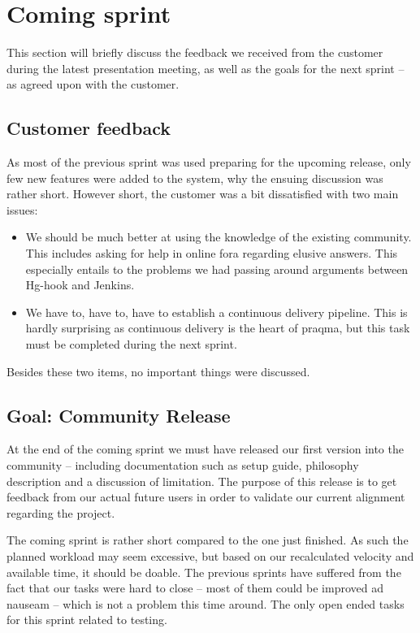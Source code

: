 \documentclass[a4paper,11pt]{article}
\begin{document}
\section{Coming sprint}
This section will briefly discuss the feedback we received from the customer during
the latest presentation meeting, as well as the goals for the next sprint -- as 
agreed upon with the customer.

\subsection{Customer feedback}
As most of the previous sprint was used preparing for the upcoming release, only
few new features were added to the system, why the ensuing discussion was rather short.
However short, the customer was a bit dissatisfied with two main issues:
\begin{itemize}
	\item We should be much better at using the knowledge of the existing community.
		This includes asking for help in online fora regarding elusive answers.
		This especially entails to the problems we had passing around arguments
		between Hg-hook and Jenkins.
	\item We have to, have to, have to establish a continuous delivery pipeline.
		This is hardly surprising as continuous delivery is the heart of praqma,
		but this task must be completed during the next sprint.
\end{itemize}

Besides these two items, no important things were discussed.

\subsection{Goal: Community Release}
At the end of the coming sprint we must have released our first version into the
community -- including documentation such as setup guide, philosophy description
and a discussion of limitation. The purpose of this release is to get feedback
from our actual future users in order to validate our current alignment regarding
the project.

The coming sprint is rather short compared to the one just finished. As such the
planned workload may seem excessive, but based on our recalculated velocity and
available time, it should be doable. The previous sprints have suffered from the
fact that our tasks were hard to close -- most of them could be improved ad nauseam --
which is not a problem this time around. The only open ended tasks for this sprint
related to testing.
\end{document}
